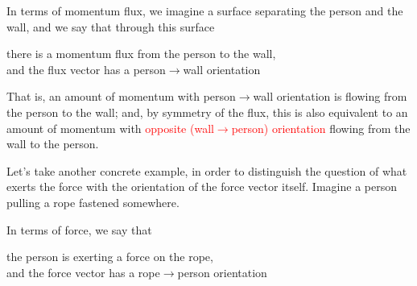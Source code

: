 \documentclass[a4paper,12pt,%
onecolumn,oneside,titlepage,%
british%
]{memoir}
\renewcommand*{\|}[1][]{\nonscript\:#1\vert\nonscript\:\mathopen{}}
\begin{document}
{In terms of momentum flux, we imagine a surface separating the person and the wall, and we say that through this surface\noprelistbreak
\begin{center}\color{green}
  there is a momentum flux from the person to the wall,\\
  and the flux vector has a \textcolor{bluepurple}{person$\rightarrow$wall orientation}
\end{center}
}
\noindent That is, an amount of momentum with \textcolor{bluepurple}{person$\rightarrow$wall orientation} is flowing from the person to the wall; and, by symmetry of the flux, this is also equivalent to an amount of momentum with \textcolor{red}{opposite (wall$\rightarrow$person) orientation} flowing from the wall to the person.

\medskip

Let's take another concrete example, in order to distinguish the question of what exerts the force with the orientation of the force vector itself. Imagine a person pulling a rope fastened somewhere. {In terms of force, we say that\noprelistbreak%
\begin{center}\color{green}
  the person is exerting a force on the rope,\\
  and the force vector has a \textcolor{bluepurple}{rope$\rightarrow$person orientation}
\end{center}
}
\end{document}
